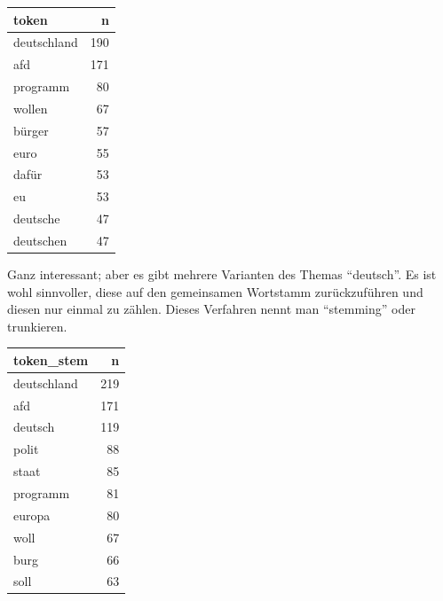 \documentclass[12pt,]{book}
\newenvironment{Shaded}{\begin{snugshade}}{\end{snugshade}}
\newcommand{\KeywordTok}[1]{\textcolor[rgb]{0.13,0.29,0.53}{\textbf{{#1}}}}
\newcommand{\DataTypeTok}[1]{\textcolor[rgb]{0.13,0.29,0.53}{{#1}}}
\newcommand{\DecValTok}[1]{\textcolor[rgb]{0.00,0.00,0.81}{{#1}}}
\newcommand{\StringTok}[1]{\textcolor[rgb]{0.31,0.60,0.02}{{#1}}}
\newcommand{\OtherTok}[1]{\textcolor[rgb]{0.56,0.35,0.01}{{#1}}}
\newcommand{\NormalTok}[1]{{#1}}
\begin{document}
\begin{tabular}{l|r}
\hline
token & n\\
\hline
deutschland & 190\\
\hline
afd & 171\\
\hline
programm & 80\\
\hline
wollen & 67\\
\hline
bürger & 57\\
\hline
euro & 55\\
\hline
dafür & 53\\
\hline
eu & 53\\
\hline
deutsche & 47\\
\hline
deutschen & 47\\
\hline
\end{tabular}

Ganz interessant; aber es gibt mehrere Varianten des Themas ``deutsch''.
Es ist wohl sinnvoller, diese auf den gemeinsamen Wortstamm
zurückzuführen und diesen nur einmal zu zählen. Dieses Verfahren nennt
man ``stemming'' oder trunkieren.

\begin{Shaded}
\end{Shaded}

\begin{tabular}{l|r}
\hline
token\_stem & n\\
\hline
deutschland & 219\\
\hline
afd & 171\\
\hline
deutsch & 119\\
\hline
polit & 88\\
\hline
staat & 85\\
\hline
programm & 81\\
\hline
europa & 80\\
\hline
woll & 67\\
\hline
burg & 66\\
\hline
soll & 63\\
\hline
\end{tabular}
\end{document}
